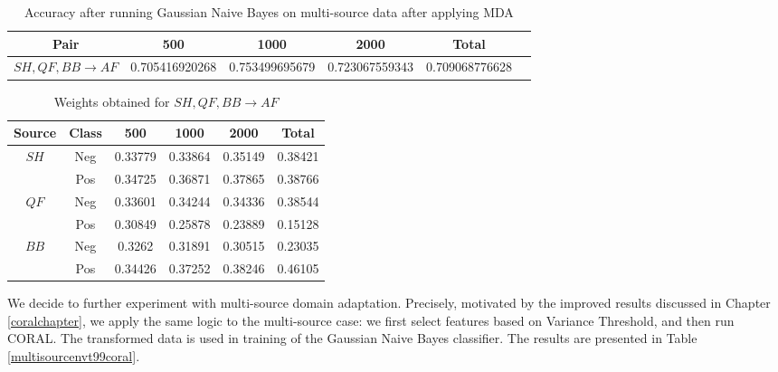 \begin{table}[ht]
    \begin{center}
    \caption{Accuracy after running Gaussian Naive Bayes on multi-source data after applying MDA}
    \begin{tabular}[c]{|c|c|c|c|c|c|}
        \hline
        Pair & 500 & 1000 & 2000 & Total \\
        \hline
                             
        $SH, QF, BB \rightarrow AF$ & 0.705416920268 &	0.753499695679 & 0.723067559343	& 0.709068776628 \\ %

        \hline
    \end{tabular}
    \label{multisourcemda1}
   \end{center}
\end{table}


\begin{table}[ht]
    \begin{center}
    \caption{Weights obtained for $SH, QF, BB \rightarrow AF$ }
    \begin{tabular}[c]{|c|c|c|c|c|c|}

        \hline
        Source & Class & 500 & 1000 & 2000 & Total \\
        \hline
    	\multirow{2}{*}{$SH$} &Neg & 0.33779 & 0.33864 & 0.35149 & 0.38421 \\ & Pos  & 0.34725 & 0.36871 & 0.37865  & 0.38766 \\ 
    	\hline
    	\multirow{2}{*}{$QF$} &Neg  & 0.33601 & 0.34244 & 0.34336 & 0.38544 \\ & Pos  & 0.30849 & 0.25878 & 0.23889  & 0.15128 \\
    	\hline
    	\multirow{2}{*}{$BB$} &Neg  & 0.3262  & 0.31891 & 0.30515 & 0.23035 \\ & Pos  & 0.34426 & 0.37252 & 0.38246  & 0.46105 \\ 

        \hline
    \end{tabular}
    \label{sampleweights}
   \end{center}
\end{table}


We decide to further experiment with multi-source domain adaptation. Precisely, motivated by the improved results discussed in Chapter \ref{coralchapter}, we apply the same logic to the multi-source case: we first select features based on Variance Threshold, and then run CORAL. The transformed data is used in training of the Gaussian Naive Bayes classifier. The results are presented in Table \ref{multisourcenvt99coral}.


